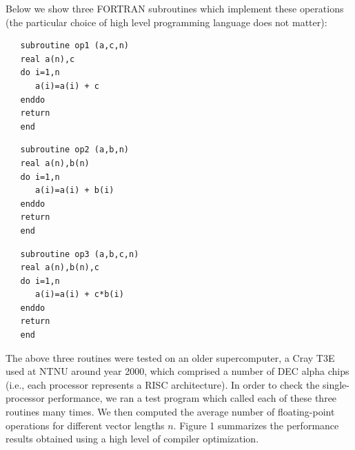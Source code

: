\documentclass[11pt]{article}
\begin{document}
Below we show three FORTRAN subroutines which implement these operations
(the particular choice of high level programming language does not matter):
\begin{verbatim}
   subroutine op1 (a,c,n)
   real a(n),c
   do i=1,n
      a(i)=a(i) + c
   enddo
   return
   end
\end{verbatim}

\begin{verbatim}
   subroutine op2 (a,b,n)
   real a(n),b(n)
   do i=1,n
      a(i)=a(i) + b(i)
   enddo
   return
   end
\end{verbatim}

\begin{verbatim}
   subroutine op3 (a,b,c,n)
   real a(n),b(n),c
   do i=1,n
      a(i)=a(i) + c*b(i)
   enddo
   return
   end
\end{verbatim}

The above three routines were tested on an older supercomputer, 
a Cray T3E used at NTNU around year 2000, 
which comprised a number of DEC alpha chips 
(i.e., each processor represents a RISC architecture).
In order to check the single-processor performance, we ran a 
test program which called each of these three routines many times.
We then computed the average number of floating-point operations
for different vector lengths $n$. 
Figure 1 summarizes the performance results obtained
using a high level of compiler optimization. \\
\end{document}
